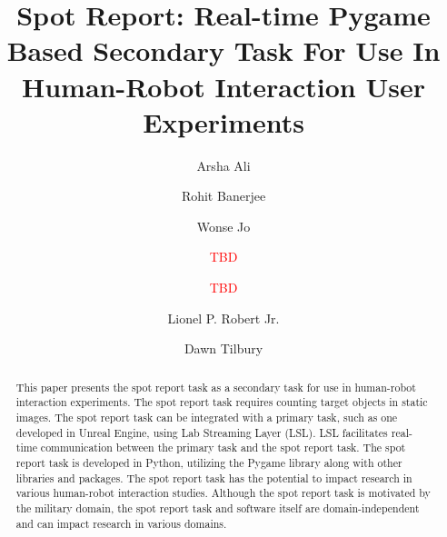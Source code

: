 \documentclass[preprint,12pt, a4paper]{elsarticle}
\begin{document}
\begin{frontmatter}





\title{Spot Report: Real-time Pygame Based Secondary Task For Use In Human-Robot Interaction User Experiments}


\author[a]{Arsha Ali}
\author[a]{Rohit Banerjee}
\author[a]{Wonse Jo}
\author[b]{\textcolor{red}{TBD}}
\author[c]{\textcolor{red}{TBD}}
\author[a]{Lionel P. Robert Jr.}
\author[a]{Dawn Tilbury}


\address[a]{Robotics Department, University of Michigan, Ann Arbor, MI, 48109, USA}
\address[b]{\textcolor{red}{Affiliation and address TBD}}
\address[c]{\textcolor{red}{Affiliation and address TBD}}


\begin{abstract}
This paper presents the spot report task as a secondary task for use in human-robot interaction experiments. The spot report task requires counting target objects in static images. The spot report task can be integrated with a primary task, such as one developed in Unreal Engine, using Lab Streaming Layer (LSL). LSL facilitates real-time communication between the primary task and the spot report task. The spot report task is developed in Python, utilizing the Pygame library along with other libraries and packages. The spot report task has the potential to impact research in various human-robot interaction studies. Although the spot report task is motivated by the military domain, the spot report task and software itself are domain-independent and can impact research in various domains.
\end{abstract}


\end{frontmatter}
\end{document}
